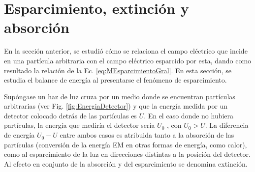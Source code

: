 \section{Esparcimiento, extinción y absorción}

En la sección anterior, se estudió cómo se relaciona el campo eléctrico que incide en una partícula arbitraria con el campo eléctrico esparcido por esta, dando como resultado la relación de la Ec. \eqref{eq:MEsparcimientoGral}. En esta sección, se estudia el balance de energía al presentarse el fenómeno de esparcimiento.

Supóngase un haz de luz cruza por un medio donde se encuentran partículas arbitrarias (ver Fig. \ref{fig:EnergiaDetector}) y que la energía medida por un detector colocado detrás de las partículas  es $U$. En el caso donde no hubiera partículas, la energía que mediría el detector sería $U_0$ , con $U_0 > U$.  La diferencia de energía $U_0-U$ entre ambos casos es atribuida tanto a la absorción de las partículas (conversión de la energía EM en otras formas de energía, como calor), como al esparcimiento de la luz en direcciones distintas a la posición del detector. Al efecto en conjunto de la absorción y del esparcimiento se denomina extinción.

